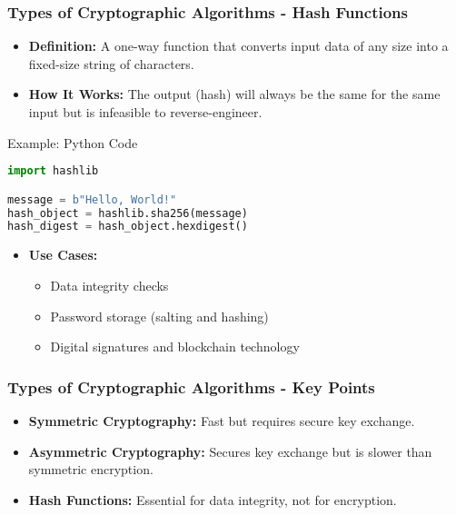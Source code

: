 \documentclass{beamer}
\begin{document}
\begin{frame}[fragile]
    \frametitle{Types of Cryptographic Algorithms - Hash Functions}
    \begin{itemize}
        \item \textbf{Definition:} 
        A one-way function that converts input data of any size into a fixed-size string of characters.
        \item \textbf{How It Works:}
        The output (hash) will always be the same for the same input but is infeasible to reverse-engineer.
    \end{itemize}

    \begin{block}{Example: Python Code}
    \begin{lstlisting}[language=Python]
import hashlib

message = b"Hello, World!"
hash_object = hashlib.sha256(message)
hash_digest = hash_object.hexdigest()
    \end{lstlisting}
    \end{block}

    \begin{itemize}
        \item \textbf{Use Cases:}
        \begin{itemize}
            \item Data integrity checks
            \item Password storage (salting and hashing)
            \item Digital signatures and blockchain technology
        \end{itemize}
    \end{itemize}
\end{frame}

\begin{frame}[fragile]
    \frametitle{Types of Cryptographic Algorithms - Key Points}
    \begin{itemize}
        \item \textbf{Symmetric Cryptography:} Fast but requires secure key exchange.
        \item \textbf{Asymmetric Cryptography:} Secures key exchange but is slower than symmetric encryption.
        \item \textbf{Hash Functions:} Essential for data integrity, not for encryption.
    \end{itemize}
\end{frame}
\end{document}

